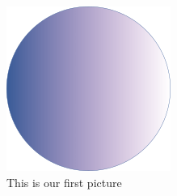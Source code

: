 \begin{figure}[h]
    \centering
    \includegraphics{figures/gradient-circle.png}
    \caption{This is our first picture}
    \label{fig:gradient-circle}
\end{figure}
